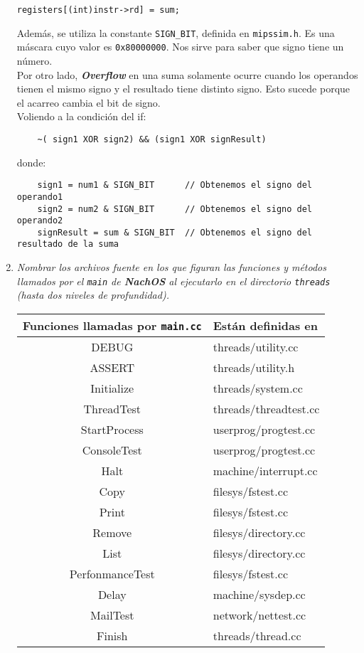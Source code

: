 \begin{enumerate}
\begin{lstlisting}[style=C]
  registers[(int)instr->rd] = sum;
\end{lstlisting}
Además, se utiliza la constante \texttt{SIGN\_BIT}, definida en \texttt{mipssim.h}. Es una máscara cuyo valor es  \texttt{0x80000000}. Nos sirve para saber que signo tiene un número.\\
Por otro lado, \textbf{\textit{Overflow}} en una suma solamente ocurre cuando los operandos tienen el mismo signo y el resultado tiene distinto signo. Esto sucede porque el acarreo cambia el bit de signo.\\
Voliendo a la condición del if:
\begin{verbatim}
    ~( sign1 XOR sign2) && (sign1 XOR signResult)
\end{verbatim}
donde:
\begin{verbatim}
    sign1 = num1 & SIGN_BIT      // Obtenemos el signo del operando1
    sign2 = num2 & SIGN_BIT      // Obtenemos el signo del operando2
    signResult = sum & SIGN_BIT  // Obtenemos el signo del resultado de la suma
\end{verbatim}

\item \textit{Nombrar los archivos fuente en los que figuran las funciones y métodos llamados por el \texttt{main} de \textbf{\textit{NachOS}} al ejecutarlo en el directorio \texttt{threads} (hasta dos niveles de profundidad).}
\begin{center}
    \begin{tabular}{|c|l|}
\hline
Funciones llamadas por \texttt{main.cc}    &    Están definidas en    \\
\hline
DEBUG             &    threads/utility.cc    \\
ASSERT            &    threads/utility.h    \\
Initialize        &    threads/system.cc    \\
ThreadTest        &    threads/threadtest.cc    \\
StartProcess      &    userprog/progtest.cc    \\
ConsoleTest       &    userprog/progtest.cc    \\
Halt              &    machine/interrupt.cc    \\
Copy              &    filesys/fstest.cc	\\
Print             &    filesys/fstest.cc	\\
Remove            &    filesys/directory.cc    \\
List              &    filesys/directory.cc    \\
PerfonmanceTest   &    filesys/fstest.cc	\\
Delay             &    machine/sysdep.cc    \\
MailTest          &    network/nettest.cc    \\
Finish            &    threads/thread.cc    \\
\hline
    \end{tabular}
\end{center}


\end{enumerate}
